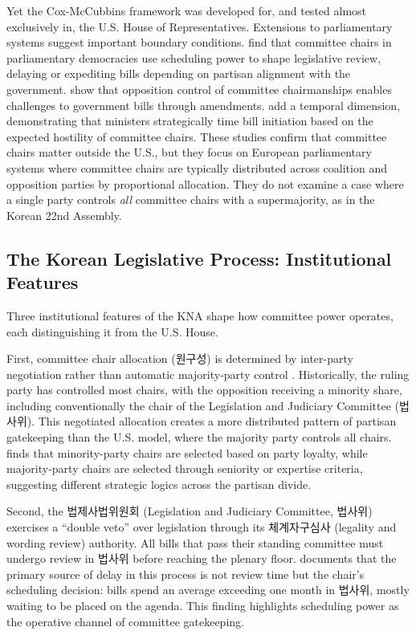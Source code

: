 \documentclass[11pt]{article}
\begin{document}
Yet the Cox-McCubbins framework was developed for, and tested almost exclusively in, the U.S. House of Representatives. Extensions to parliamentary systems suggest important boundary conditions. \citet{fortunato2017} find that committee chairs in parliamentary democracies use scheduling power to shape legislative review, delaying or expediting bills depending on partisan alignment with the government. \citet{konig2022} show that opposition control of committee chairmanships enables challenges to government bills through amendments. \citet{konig2021} add a temporal dimension, demonstrating that ministers strategically time bill initiation based on the expected hostility of committee chairs. These studies confirm that committee chairs matter outside the U.S., but they focus on European parliamentary systems where committee chairs are typically distributed across coalition and opposition parties by proportional allocation. They do not examine a case where a single party controls \textit{all} committee chairs with a supermajority, as in the Korean 22nd Assembly.

\subsection{The Korean Legislative Process: Institutional Features}

Three institutional features of the KNA shape how committee power operates, each distinguishing it from the U.S. House.

First, committee chair allocation (원구성) is determined by inter-party negotiation rather than automatic majority-party control \citep{jung2018, leekim2022}. Historically, the ruling party has controlled most chairs, with the opposition receiving a minority share, including conventionally the chair of the Legislation and Judiciary Committee (법사위). This negotiated allocation creates a more distributed pattern of partisan gatekeeping than the U.S. model, where the majority party controls all chairs. \citet{kang2023} finds that minority-party chairs are selected based on party loyalty, while majority-party chairs are selected through seniority or expertise criteria, suggesting different strategic logics across the partisan divide.

Second, the 법제사법위원회 (Legislation and Judiciary Committee, 법사위) exercises a ``double veto'' over legislation through its 체계자구심사 (legality and wording review) authority. All bills that pass their standing committee must undergo review in 법사위 before reaching the plenary floor. \citet{ko2017} documents that the primary source of delay in this process is not review time but the chair's scheduling decision: bills spend an average exceeding one month in 법사위, mostly waiting to be placed on the agenda. This finding highlights scheduling power as the operative channel of committee gatekeeping.
\end{document}
